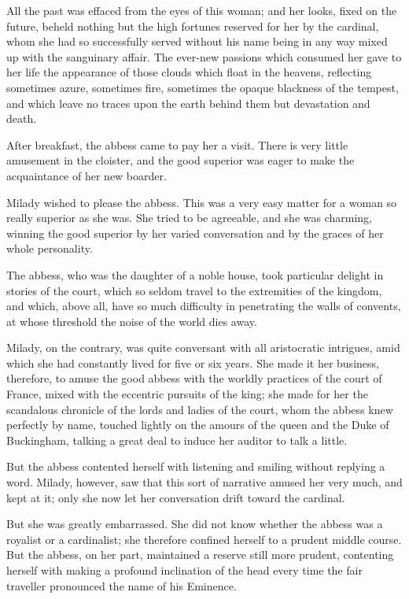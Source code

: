 All the past was effaced from the eyes of this woman; and her looks, fixed on the future, beheld nothing but the high fortunes reserved for her by the cardinal, whom she had so successfully served without his name being in any way mixed up with the sanguinary affair. The ever-new passions which consumed her gave to her life the appearance of those clouds which float in the heavens, reflecting sometimes azure, sometimes fire, sometimes the opaque blackness of the tempest, and which leave no traces upon the earth behind them but devastation and death. 

After breakfast, the abbess came to pay her a visit. There is very little amusement in the cloister, and the good superior was eager to make the acquaintance of her new boarder. 

Milady wished to please the abbess. This was a very easy matter for a woman so really superior as she was. She tried to be agreeable, and she was charming, winning the good superior by her varied conversation and by the graces of her whole personality. 

The abbess, who was the daughter of a noble house, took particular delight in stories of the court, which so seldom travel to the extremities of the kingdom, and which, above all, have so much difficulty in penetrating the walls of convents, at whose threshold the noise of the world dies away. 

Milady, on the contrary, was quite conversant with all aristocratic intrigues, amid which she had constantly lived for five or six years. She made it her business, therefore, to amuse the good abbess with the worldly practices of the court of France, mixed with the eccentric pursuits of the king; she made for her the scandalous chronicle of the lords and ladies of the court, whom the abbess knew perfectly by name, touched lightly on the amours of the queen and the Duke of Buckingham, talking a great deal to induce her auditor to talk a little. 

But the abbess contented herself with listening and smiling without replying a word. Milady, however, saw that this sort of narrative amused her very much, and kept at it; only she now let her conversation drift toward the cardinal. 

But she was greatly embarrassed. She did not know whether the abbess was a royalist or a cardinalist; she therefore confined herself to a prudent middle course. But the abbess, on her part, maintained a reserve still more prudent, contenting herself with making a profound inclination of the head every time the fair traveller pronounced the name of his Eminence. 

